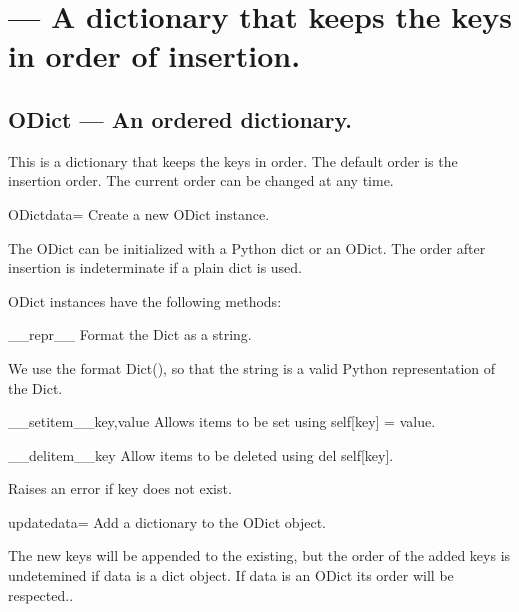 

\section{ --- A dictionary that keeps the keys in order of insertion.}
\label{sec:odict}




\subsection{ODict --- An ordered dictionary.}
    This is a dictionary that keeps the keys in order.
    The default order is the insertion order. The current order can be
    changed at any time.
    

\begin{classdesc}{ODict}{data={}}
Create a new ODict instance.

        The ODict can be initialized with a Python dict or an ODict.
        The order after insertion is indeterminate if a plain dict is used.
        
\end{classdesc}

ODict instances have the following methods:

\begin{funcdesc}{__repr__}{}
Format the Dict as a string.

        We use the format Dict({}), so that the string is a valid Python
        representation of the Dict.
        
\end{funcdesc}

\begin{funcdesc}{__setitem__}{key,value}
Allows items to be set using self[key] = value.
\end{funcdesc}

\begin{funcdesc}{__delitem__}{key}
Allow items to be deleted using del self[key].

        Raises an error if key does not exist.
        
\end{funcdesc}

\begin{funcdesc}{update}{data={}}
Add a dictionary to the ODict object.

        The new keys will be appended to the existing, but the order of the
        added keys is undetemined if data is a dict object. If data is an ODict
        its order will be respected.. 
        
\end{funcdesc}

